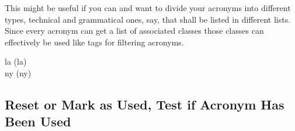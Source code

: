 \documentclass[load-preamble+]{cnltx-doc}
\begin{document}
This might be useful if you can and want to divide your acronyms into
different types, technical and grammatical ones, say, that shall be listed in
different lists.  Since every acronym can get a list of associated classes
those classes can effectively be used like tags for filtering acronyms.

\begin{example}
  \acl{la} (\acs{la}) \\
  \acl{ny} (\acs{ny})
\end{example}

\subsection{Reset or Mark as Used, Test if Acronym Has Been Used}
\end{document}
